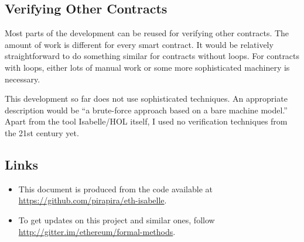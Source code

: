 \documentclass[11pt,a4paper]{article}
\begin{document}
\subsection{Verifying Other Contracts}

Most parts of the development can be reused for verifying other contracts.
The amount of work is
different for every smart contract.  It would be relatively
straightforward to do something similar for
contracts without loops.  For contracts with loops,
either lots of manual work or some more
sophisticated machinery is necessary.

This development so far does not use sophisticated techniques.
An appropriate description would be ``a brute-force approach based on a bare machine model.''
Apart from the tool Isabelle/HOL itself, I used no verification techniques from the 21st century yet.

\subsection{Links}

\begin{itemize}
\item This document is produced from the code available at
\url{https://github.com/pirapira/eth-isabelle}.
\item To get updates on this project and similar ones, follow \url{http://gitter.im/ethereum/formal-methods}.
\end{itemize}



%
%
\end{document}
